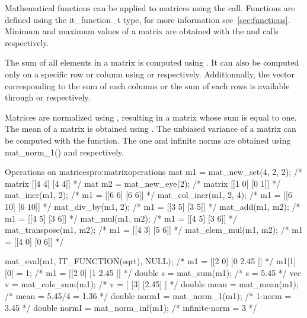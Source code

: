     Mathematical functions can be applied to matrices using the
     call. Functions are defined
    using the it\_function\_t type, for more information see~\ref{sec:functions}. 
    Minimum and maximum values of a matrix are
    obtained with the  and  calls respectively.

    The sum of all elements in a matrix is computed using
    . It can also be computed only on a specific
    row or column using  or
     respectively. Additionnally, the vector
    corresponding to the sum of each columns or the sum of each rows
    is available through  or 
    respectively.

    Matrices are normalized using ,
    resulting in a matrix whose sum is equal to one. The mean of a
    matrix is obtained using . The unbiased
    variance of a matrix can be computed with the
     function. The one and infinite norms
    are obtained using mat\_norm\_1() and 
    respectively.


\begin{program}{Operations on matrices}{pro:matrixoperations}
mat m1 = mat_new_set(4, 2, 2);         /* matrix [[4 4] [4 4]]     */
mat m2 = mat_new_eye(2);               /* matrix [[1 0] [0 1]]     */
mat_incr(m1, 2);                       /* m1 = [[6 6] [6 6]]       */
mat_col_incr(m1, 2, 4);                /* m1 = [[6 10] [6 10]]     */
mat_div_by(m1, 2);                     /* m1 = [[3 5] [3 5]]       */
mat_add(m1, m2);                       /* m1 = [[4 5] [3 6]]       */
mat_mul(m1, m2);                       /* m1 = [[4 5] [3 6]]       */
mat_transpose(m1, m2);                 /* m1 = [[4 3] [5 6]]       */
mat_elem_mul(m1, m2);                  /* m1 = [[4 0] [0 6]]       */

mat_eval(m1, IT_FUNCTION(sqrt), NULL); /* m1 = [[2 0] [0 2.45 ]]   */
m1[1][0] = 1;                          /* m1 = [[2 0] [1 2.45 ]]   */
double s = mat_sum(m1);                /* s = 5.45                 */
vec v = mat_cols_sum(m1);              /* v = [ [3] [2.45] ]       */
double mean = mat_mean(m1);            /* mean = 5.45/4 = 1.36     */
double norm1 = mat_norm_1(m1);         /* 1-norm = 3.45            */
double normI = mat_norm_inf(m1);       /* infinite-norm = 3        */
\end{program}

